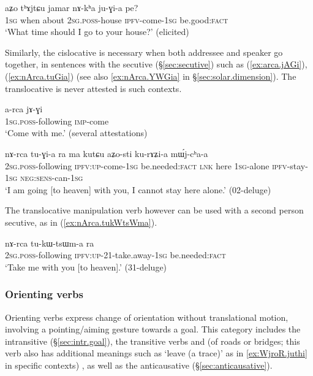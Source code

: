\begin{exe}
\ex \label{ex:nAkha.juGia}
\gll  aʑo tʰɤjtɕu jamar nɤ-kʰa ju-ɣi-a pe? \\
\textsc{1sg} when about \textsc{2sg}.\textsc{poss}-house \textsc{ipfv}-come-\textsc{1sg} be.good:\textsc{fact} \\
\glt  `What time should I go to your house?' (elicited)
\end{exe}

Similarly, the cislocative is necessary when both addressee and speaker go together, in sentences with the secutive  (§\ref{sec:secutive}) such as (\ref{ex:arca.jAGi}), (\ref{ex:nArca.tuGia}) (see also \ref{ex:nArca.YWGia} in §\ref{sec:solar.dimension}). The translocative  is never attested is such contexts.

\begin{exe}
\ex \label{ex:arca.jAGi}
\gll  a-rca jɤ-ɣi  \\
\textsc{1sg}.\textsc{poss}-following \textsc{imp}-come  \\
\glt `Come with me.' (several attestations)
\end{exe}
 
\begin{exe}
\ex \label{ex:nArca.tuGia}
\gll  nɤ-rca tu-ɣi-a ra ma kutɕu aʑo-sti ku-rɤʑi-a mɯ́j-cʰa-a \\
\textsc{2sg}.\textsc{poss}-following \textsc{ipfv}:\textsc{up}-come-\textsc{1sg} be.needed:\textsc{fact}  \textsc{lnk} here \textsc{1sg}-alone \textsc{ipfv}-stay-\textsc{1sg} \textsc{neg}:\textsc{sens}-can-\textsc{1sg} \\
\glt `I am going [to heaven] with you, I cannot stay here alone.' (02-deluge) 
\end{exe}
 
 The translocative manipulation verb  however can be used with a second person secutive, as in (\ref{ex:nArca.tukWtsWma}).
 
 \begin{exe}
\ex \label{ex:nArca.tukWtsWma}
\gll    nɤ-rca tu-kɯ-tsɯm-a ra \\
\textsc{2sg}.\textsc{poss}-following \textsc{ipfv}:\textsc{up}-2\fl{}1-take.away-\textsc{1sg} be.needed:\textsc{fact}\\
\glt `Take me with you [to heaven].' (31-deluge) 
 \end{exe}
 
\subsubsection{Orienting verbs} \label{sec:orienting.verbs} 
Orienting verbs express change of orientation without translational motion, involving a pointing/aiming gesture towards a goal. This category includes the intransitive  (§\ref{sec:intr.goal}), the transitive verbs  and  (of roads or bridges; this verb also has additional meanings such as `leave (a trace)' as in \ref{ex:WjroR.juthi} in specific contexts) , as well as the anticausative  (§\ref{sec:anticausative}). 

